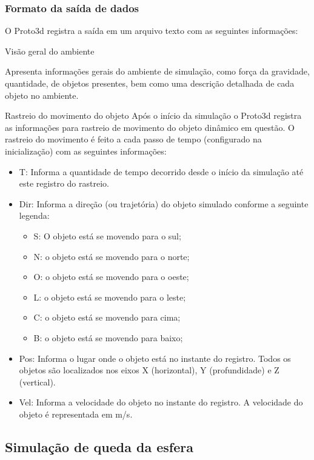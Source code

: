 \documentclass[12pt]{article}
\begin{document}
\subsubsection{Formato da saída de dados}
O Proto3d registra a saída em um arquivo texto com as seguintes informações:


Visão geral do ambiente

Apresenta informações gerais do ambiente de simulação, como força da gravidade, quantidade, de objetos presentes, bem como uma descrição detalhada de cada objeto no ambiente. 

Rastreio do movimento do objeto
Após o início da simulação o Proto3d registra as informações para rastreio de movimento do objeto dinâmico em questão. O rastreio do movimento é feito a cada passo de tempo (configurado na inicialização) com as seguintes informações:


\begin{itemize}
\item T: Informa a quantidade de tempo decorrido desde o início da simulação até este registro do rastreio.
\item Dir: Informa a direção (ou trajetória) do objeto simulado conforme a seguinte legenda: 
\begin{itemize}
\item S: O objeto está se movendo para o sul;
\item N: o objeto está se movendo para o norte;
\item O: o objeto está se movendo para o oeste;
\item L: o objeto está se movendo para o leste;
\item C: o objeto está se movendo para cima;
\item B: o objeto está se movendo para baixo;
\end{itemize}

\item Pos: Informa o lugar onde o objeto está no instante do registro. Todos os objetos são localizados nos eixos X (horizontal), Y (profundidade) e Z (vertical).

\item Vel: Informa a velocidade do objeto no instante do registro. A velocidade do objeto é representada em m/s.
\end{itemize}

\subsection{Simulação de queda da esfera }
\end{document}
